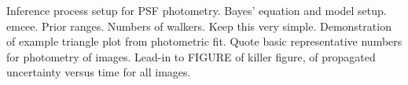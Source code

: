 \documentclass[iop]{emulateapj}
\makeatletter
\newenvironment{inlinefigure}{
\def\@captype{figure}
\noindent\begin{minipage}{0.999\linewidth}\begin{center}}
{\end{center}\end{minipage}\smallskip}
\makeatother
\begin{document}
\begin{inlinefigure}
\begin{center}
\end{center}
\end{inlinefigure}

Inference process setup for PSF photometry. Bayes' equation and model
setup.  emcee. Prior ranges. Numbers of walkers. Keep this very
simple. Demonstration of example triangle plot from photometric fit.
Quote basic representative numbers for photometry of images.  Lead-in
to FIGURE of killer figure, of propagated uncertainty versus time for
all images. 
\end{document}

